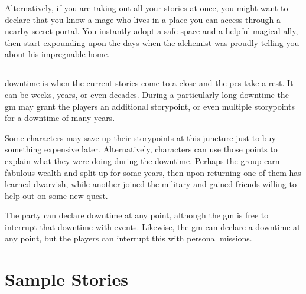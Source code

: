 \begin{multicols}{2}
Alternatively, if you are taking out all your stories at once, you might want to declare that you know a mage who lives in a place you can access through a nearby secret portal.
You instantly adopt a safe space and a helpful magical ally, then start expounding upon the days when the alchemist was proudly telling you about his impregnable home.

\subsection{}

\Gls{downtime} is when the current stories come to a close and the \glspl{pc} take a rest.
It can be weeks, years, or even decades.
During a particularly long \gls{downtime} the \gls{gm} may grant the players an additional \gls{storypoint}, or even multiple \glspl{storypoint} for a downtime of many years.

Some characters may save up their \glspl{storypoint} at this juncture just to buy something expensive later.
Alternatively, characters can use those points to explain what they were doing during the \gls{downtime}.
Perhaps the group earn fabulous wealth and split up for some years, then upon returning one of them has learned dwarvish, while another joined the military and gained friends willing to help out on some new quest.

The party can declare \gls{downtime} at any point, although the \gls{gm} is free to interrupt that \gls{downtime} with events.
Likewise, the \gls{gm} can declare a \gls{downtime} at any point, but the players can interrupt this with personal missions.

\end{multicols}

\section{Sample Stories}


